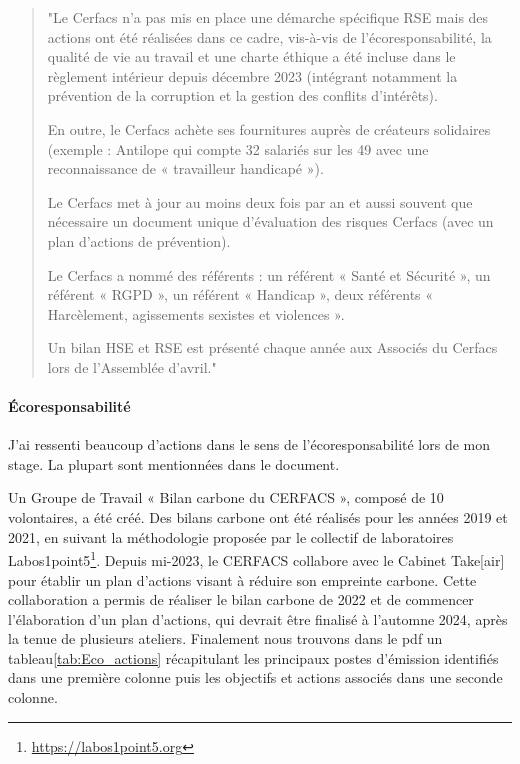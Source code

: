 \begin{quote}
\setlength{\leftmargin}{0.5cm} %
\setlength{\rightmargin}{0.5cm} %
    "Le Cerfacs n’a pas mis en place une démarche spécifique RSE mais des actions ont été réalisées dans
    ce cadre, vis-à-vis de l’écoresponsabilité, la qualité de vie au travail et une charte éthique a été
    incluse dans le règlement intérieur depuis décembre 2023 (intégrant notamment la prévention de la
    corruption et la gestion des conflits d’intérêts).
    \hspace{0,5cm}

    En outre, le Cerfacs achète ses fournitures auprès de créateurs solidaires (exemple : Antilope qui
    compte 32 salariés sur les 49 avec une reconnaissance de « travailleur handicapé »).
    \hspace{0,5cm}

    Le Cerfacs met à jour au moins deux fois par an et aussi souvent que nécessaire un document unique
    d’évaluation des risques Cerfacs (avec un plan d’actions de prévention).
    \hspace{0,5cm}

    Le Cerfacs a nommé des référents : un référent « Santé et Sécurité », un référent « \ac{RGPD} », un
    référent « Handicap », deux référents « Harcèlement, agissements sexistes et violences ».

    Un bilan HSE et RSE est présenté chaque année aux Associés du Cerfacs lors de l’Assemblée d’avril."
\end{quote}



\paragraph{Écoresponsabilité}
\hspace{0,5cm}

    J'ai ressenti beaucoup d'actions dans le sens de l'écoresponsabilité lors de mon stage. La plupart sont mentionnées dans le document.
    \vspace{0,5cm}

    Un Groupe de Travail « Bilan carbone du CERFACS », composé de 10 volontaires, a été créé. Des bilans carbone ont été réalisés pour les années 2019 et 2021, en suivant la méthodologie proposée par le collectif de laboratoires Labos1point5\footnote{\url{https://labos1point5.org}}. Depuis mi-2023, le CERFACS collabore avec le Cabinet Take[air] pour établir un plan d’actions visant à réduire son empreinte carbone. Cette collaboration a permis de réaliser le bilan carbone de 2022 et de commencer l'élaboration d'un plan d'actions, qui devrait être finalisé à l’automne 2024, après la tenue de plusieurs ateliers. Finalement nous trouvons dans le pdf un tableau\ref{tab:Eco_actions} récapitulant les principaux postes d'émission identifiés dans une première colonne puis les objectifs et actions associés dans une seconde colonne.
        
